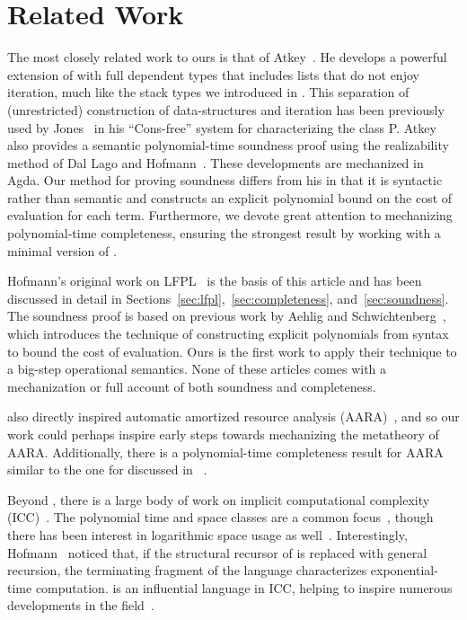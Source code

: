 \section{Related Work}

The most closely related work to ours is that of Atkey~\cite{atkeyPolynomialTimeDependent2024}.
%
He develops a powerful extension of \lfpl with full dependent types
that includes lists that do not enjoy iteration, much
like the stack types we introduced in .
%
This separation of (unrestricted) construction of data-structures and iteration has
been previously used by Jones~\cite{Jones2001} in his
``Cons-free'' system for characterizing the class P.
%
Atkey also provides a semantic polynomial-time soundness proof using the realizability method of Dal Lago and Hofmann~\cite{dallagoRealizabilityModelsImplicit2011}. These developments are mechanized in Agda. Our method for proving soundness differs from his in that it is syntactic rather than semantic and constructs an explicit polynomial bound on the cost of evaluation for each term. Furthermore, we devote great attention to mechanizing polynomial-time completeness, ensuring the strongest result by working with a minimal version of \lfpl.

Hofmann's original work on LFPL~\cite{hofmannLinearTypesNonsizeincreasing1999,hofmannStrengthNonsizeIncreasing2002} is the basis of this article and has been discussed in detail in Sections~\ref{sec:lfpl},~\ref{sec:completeness}, and~\ref{sec:soundness}.
%
The soundness proof is based on previous work by Aehlig and Schwichtenberg~\cite{aehligSyntacticalAnalysisNonsizeincreasing2002}, which introduces the technique of constructing explicit polynomials from \lfpl syntax to bound the cost of evaluation. Ours is the first work to apply their technique to a big-step operational semantics.
%
None of these articles comes with a mechanization or full account of both soundness and completeness.

\lfpl also directly inspired automatic amortized resource analysis (AARA)~\cite{HoffmJ22}, and so our work could perhaps inspire early steps towards mechanizing the metatheory of AARA. Additionally, there is a polynomial-time completeness result for AARA similar to the one for \lfpl discussed in ~\cite{phamTypableFragmentsPolynomial2021}.

\enlargethispage{\baselineskip}
Beyond \lfpl, there is a large body of work on implicit computational complexity (ICC)~\cite{dallagoImplicitComputationComplexity2022}. The polynomial time and space classes are a common focus~\cite{gaboardiSoftLinearLogic2008,gaboardiImplicitCharacterizationPSPACE2012}, though there has been interest in logarithmic space usage as well~\cite{schoppStratifiedBoundedAffine2007, ramyaaRamifiedCorecurrenceLogspace2011}. Interestingly, Hofmann~\cite{hofmannStrengthNonsizeIncreasing2002} noticed that, if the structural recursor of \lfpl is replaced with general recursion, the terminating fragment of the language characterizes exponential-time computation. \lfpl is an influential language in ICC, helping to inspire numerous developments in the field~\cite{dallagoRealizabilityModelsImplicit2011,marion2003,marion2011,baillot2016,dalLago2009,bonfante2011}.

